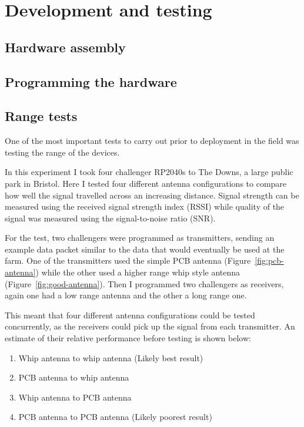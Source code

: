\section{Development and testing}

\subsection{Hardware assembly}

\subsection{Programming the hardware}

\subsection{Range tests}

One of the most important tests to carry out prior to deployment in the field
was testing the range of the devices.

In this experiment I took four challenger RP2040s to The Downs, a large public
park in Bristol. Here I tested four different antenna configurations to compare
how well the signal travelled across an increasing distance. Signal strength can
be measured using the received signal strength index (RSSI) while quality of the
signal was measured using the signal-to-noise ratio (SNR). 

For the test, two challengers were programmed as transmitters, sending an
example data packet similar to the data that would eventually be used at the
farm. One of the transmitters used the simple PCB antenna
(Figure~\ref{fig:pcb-antenna}) while the other used a higher range whip style
antenna (Figure~\ref{fig:good-antenna}). Then I programmed two challengers as
receivers, again one had a low range antenna and the other a long range one.

This meant that four different antenna configurations could be tested
concurrently, as the receivers could pick up the signal from each transmitter.
An estimate of their relative performance before testing is shown below:

\begin{enumerate}
    \item Whip antenna to whip antenna (Likely best result)
    \item PCB antenna to whip antenna
    \item Whip antenna to PCB antenna
    \item PCB antenna to PCB antenna (Likely poorest result)
\end{enumerate}

